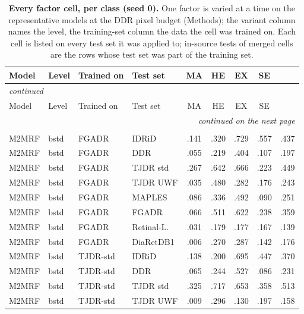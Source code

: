 \begin{landscape}
{\scriptsize\setlength{\tabcolsep}{3.2pt}\setlength{\LTcapwidth}{\textwidth}\renewcommand{\arraystretch}{1.08}
\begin{longtable}{l l l l c c c c c}
\caption{\textbf{Every factor cell, per class (seed 0).} One factor is varied at a time on the representative models at the DDR pixel budget (Methods); the variant column names the level, the training-set column the data the cell was trained on. Each cell is listed on every test set it was applied to; in-source tests of merged cells are the rows whose test set was part of the training set.}\label{stab:factors}\\
\toprule
Model & Level & Trained on & Test set & MA & HE & EX & SE & \mAUPR{} \\
\midrule
\endfirsthead
\multicolumn{9}{l}{\textit{continued}}\\
\toprule
Model & Level & Trained on & Test set & MA & HE & EX & SE & \mAUPR{} \\
\midrule
\endhead
\midrule
\multicolumn{9}{r}{\textit{continued on the next page}}\\
\endfoot
\bottomrule
\endlastfoot
\multicolumn{9}{l}{\textbf{Training source}}\\
M2MRF & bstd & FGADR & IDRiD & .141 & .320 & .729 & .557 & .437 \\
M2MRF & bstd & FGADR & DDR & .055 & .219 & .404 & .107 & .197 \\
M2MRF & bstd & FGADR & TJDR std & .267 & .642 & .666 & .223 & .449 \\
M2MRF & bstd & FGADR & TJDR UWF & .035 & .480 & .282 & .176 & .243 \\
M2MRF & bstd & FGADR & MAPLES & .086 & .336 & .492 & .090 & .251 \\
M2MRF & bstd & FGADR & FGADR & .066 & .511 & .622 & .238 & .359 \\
M2MRF & bstd & FGADR & Retinal-L. & .031 & .179 & .177 & .167 & .139 \\
M2MRF & bstd & FGADR & DiaRetDB1 & .006 & .270 & .287 & .142 & .176 \\
M2MRF & bstd & TJDR-std & IDRiD & .138 & .200 & .695 & .447 & .370 \\
M2MRF & bstd & TJDR-std & DDR & .065 & .244 & .527 & .086 & .231 \\
M2MRF & bstd & TJDR-std & TJDR std & .325 & .717 & .653 & .358 & .513 \\
M2MRF & bstd & TJDR-std & TJDR UWF & .009 & .296 & .130 & .197 & .158 \\

\end{longtable}}
\end{landscape}
